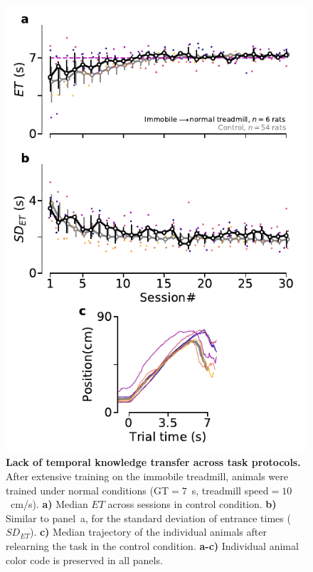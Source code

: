 \begin{figure}[bt!]
  \begin{center}
    \includegraphics[width=.4\linewidth]{ch-appendicies/figures/Imm2CtrlTrd.pdf}
    \caption[Immobile animals relearning the task]
    {\textbf{Lack of temporal knowledge transfer across task protocols.}
    After extensive training on the immobile treadmill, animals were trained under normal conditions (GT$=7$~s, treadmill speed$=10$~cm/s).
    \textbf{a)}
    Median $ET$ across sessions in control condition.
    \textbf{b)}
    Similar to panel~a, for the standard deviation of entrance times ($SD_{ET}$).
    \textbf{c)}
    Median trajectory of the individual animals after relearning the task in the control condition.
    \textbf{a-c)}
    Individual animal color code is preserved in all panels.
    }
    \label{fig:appendix:Imm2Ctrl}
  \end{center}
\end{figure}
